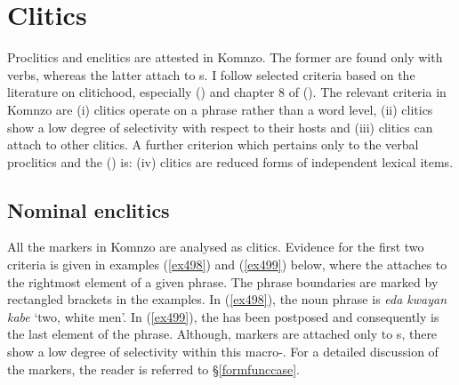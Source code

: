 \section{Clitics} \label{clitics}

Proclitics and enclitics are attested in Komnzo. The former are found only with verbs, whereas the latter attach to s. I follow selected criteria based on the literature on clitichood, especially (\citealt{Zwicky:1983jd}) and chapter 8 of (\citealt{Anderson:1992uw}). The relevant criteria in Komnzo are (i) clitics operate on a phrase rather than a word level, (ii) clitics show a low degree of selectivity with respect to their hosts and (iii) clitics can attach to other clitics. A further criterion which pertains only to the verbal proclitics and the ()   is: (iv) clitics are reduced forms of independent lexical items.

\subsection{Nominal enclitics}\label{nomenclitics}

All the  markers in Komnzo are analysed as clitics. Evidence for the first two criteria is given in examples (\ref{ex498}) and (\ref{ex499}) below, where the  attaches to the rightmost element of a given phrase. The phrase boundaries are marked by rectangled brackets in the examples. In (\ref{ex498}), the noun phrase is \emph{eda kwayan kabe} `two, white men'. In (\ref{ex499}), the  has been postposed and consequently is the last element of the phrase. Although,  markers are attached only to s, there show a low degree of selectivity within this macro-. For a detailed discussion of the  markers, the reader is referred to \S{}\ref{formfunccase}.

